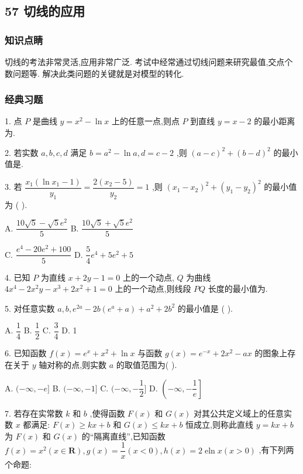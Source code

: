 \subsection*{57 切线的应用}

\subsubsection*{知识点睛}

切线的考法非常灵活,应用非常广泛. 考试中经常通过切线问题来研究最值,交点个数问题等. 解决此类问题的关键就是对模型的转化.

\subsubsection*{经典习题}

1. 点 $P$ 是曲线 $y = {x}^{2} - \ln x$ 上的任意一点,则点 $P$ 到直线 $y = x - 2$ 的最小距离为\blkda{}.

2. 若实数 $a,b,c,d$ 满足 $b = {a}^{2} - \ln a,d = c - 2$ ,则 ${\left( a - c\right) }^{2} + {\left( b - d\right) }^{2}$ 的最小值是\blkda{}.

3. 若 $\dfrac{{x}_{1}\left( {\ln {x}_{1} - 1}\right) }{{y}_{1}} = \dfrac{2\left( {{x}_{2} - 5}\right) }{{y}_{2}} = 1$ ,则 ${\left( {x}_{1} - {x}_{2}\right) }^{2} + {\left( {y}_{1} - {y}_{2}\right) }^{2}$ 的最小值为 (   ).

A. $\dfrac{{10}\sqrt{5} - \sqrt{5}{{e}}^{2}}{5}$ B. $\dfrac{{10}\sqrt{5} + \sqrt{5}{{e}}^{2}}{5}$

C. $\dfrac{{{e}}^{4} - {20}{{e}}^{2} + {100}}{5}$ D. $\dfrac{5}{4}{{e}}^{4} + 5{{e}}^{2} + 5$

4. 已知 $P$ 为直线 $x + {2y} - 1 = 0$ 上的一个动点, $Q$ 为曲线 $4{x}^{4} - 2{x}^{2}y - {x}^{3} + 2{x}^{2} + 1 = 0$ 上的一个动点,则线段 ${PQ}$ 长度的最小值为\blkda{}.

5. 对任意实数 $a,b,{{e}}^{2a} - {2b}\left( {{{e}}^{a} + a}\right)  + {a}^{2} + 2{b}^{2}$ 的最小值是 (   ).

A. $\dfrac{1}{4}$ B. $\dfrac{1}{2}$ C. $\dfrac{3}{4}$ D. 1

6. 已知函数 $f\left( x\right)  = {{e}}^{x} + {x}^{2} + \ln x$ 与函数 $g\left( x\right)  = {{e}}^{-x} + 2{x}^{2} - {ax}$ 的图象上存在关于 $y$ 轴对称的点,则实数 $a$ 的取值范围为(   ).

A. $( - \infty , - {e}\rbrack$ B. $( - \infty , - 1\rbrack$ C. $( - \infty , - \dfrac{1}{2}\rbrack$ D. $\left( {-\infty , - \dfrac{1}{{e}}}\right\rbrack$

7. 若存在实常数 $k$ 和 $b$ ,使得函数 $F\left( x\right)$ 和 $G\left( x\right)$ 对其公共定义域上的任意实数 $x$ 都满足: $F\left( x\right)  \geq  {kx} + b$ 和 $G\left( x\right)  \leq  {kx} + b$ 恒成立,则称此直线 $y = {kx} + b$ 为 $F\left( x\right)$ 和 $G\left( x\right)$ 的“隔离直线”,已知函数 $f\left( x\right)  = {x}^{2}\left( {x \in  \mathbf{R}}\right) ,g\left( x\right)  = \dfrac{1}{x}\left( {x < 0}\right) ,h\left( x\right)  = 2\operatorname{eln}x\left( {x > 0}\right)$ ,有下列两个命题:

